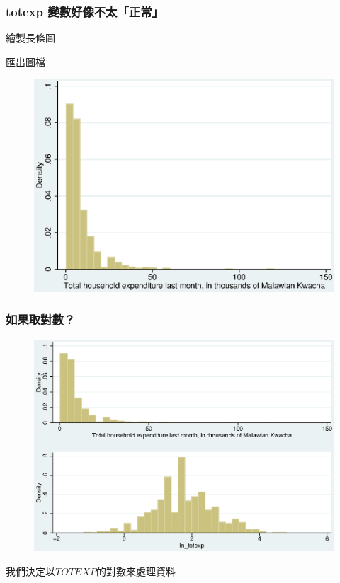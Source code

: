 \begin{frame}
    \frametitle{totexp 變數好像不太「正常」}
    繪製長條圖


    匯出圖檔


    \begin{figure}
        \includegraphics[height=0.5\textheight]{../Results/Q4_11_hist_of_totexp.eps}
    \end{figure}
\end{frame}

\begin{frame}
    \frametitle{如果取對數？}

    \begin{figure}
        \includegraphics[height=0.8\textheight]{../Results/Q4_11_compare_totexp.eps}
    \end{figure}

    我們決定以$TOTEXP$的對數來處理資料
\end{frame}

